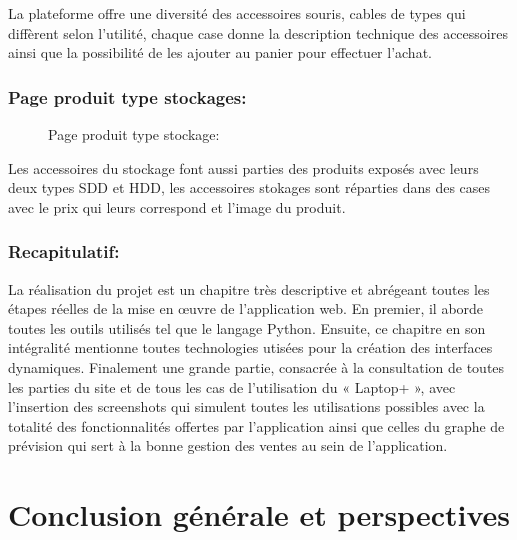 \documentclass[a4paper]{report}
\begin{document}
\begin{doublespace}
\begin{doublespace}
\begin{doublespace}
\begin{doublespace}
\begin{doublespace}
\begin{doublespace}
                        La plateforme offre une diversité des accessoires souris, cables de types qui diffèrent selon l'utilité, chaque case donne la description technique des accessoires ainsi que la possibilité de les ajouter au panier pour effectuer l'achat.

                        \subsection{Page produit type stockages:}
                        \begin{figure}[H]
                            \begin{center}
                                \caption{Page produit type stockage:}
                            \end{center}
                        \end{figure}

                        Les accessoires du stockage font aussi parties des produits exposés avec leurs deux types SDD et HDD, les accessoires stokages sont réparties dans des cases avec le prix qui leurs correspond et l'image du produit.
                        \subsection{Recapitulatif:}
                        La réalisation du projet est un chapitre très descriptive et abrégeant toutes les étapes réelles de la mise en œuvre de l'application web. En premier, il aborde toutes les outils utilisés tel que le langage  Python. Ensuite, ce chapitre en son intégralité mentionne toutes technologies utisées pour la création des interfaces dynamiques. Finalement une grande partie, consacrée à la consultation de toutes les parties du site et de tous les cas de l’utilisation du « Laptop+ », avec l’insertion des screenshots qui simulent toutes les utilisations possibles avec la totalité des fonctionnalités offertes par l'application ainsi que celles du graphe de prévision qui sert à la bonne gestion des ventes au sein de l'application.
                        \chapter{Conclusion générale et perspectives}
                        \fancyhead[L]{\hspace*{5cm}}

\end{doublespace}
\end{doublespace}
\end{doublespace}
\end{doublespace}
\end{doublespace}
\end{doublespace}
\end{document}
